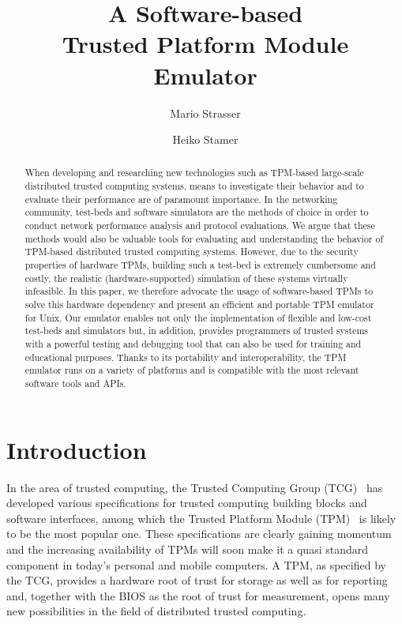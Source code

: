 \documentclass[runningheads]{llncs}
\title{\bf A Software-based\\ Trusted Platform Module Emulator}
\author{Mario Strasser\inst{1} \and Heiko Stamer\inst{2}}
\institute{
	ETH Zurich, Switzerland\\
	\email{strasser@tik.ee.ethz.ch}\\[3mm]
\and
	Fachbereich Elektrotechnik/Informatik, Universit\"at Kassel\\
	34109 Kassel, Germany\\
	\email{stamer@theory.informatik.uni-kassel.de}\\
}
\date{}
\begin{document}
\maketitle

\begin{abstract}
	When developing and researching new technologies such as TPM-based
	large-scale distributed trusted computing systems, means to investigate
	their behavior and to evaluate their performance are of paramount
	importance. In the networking community, test-beds and software simulators
	are the methods of choice in order to conduct network performance analysis
	and protocol evaluations. We argue that these methods would also be valuable
	tools for evaluating and understanding the behavior of TPM-based distributed
	trusted computing systems. However, due to the security properties of
	hardware TPMs, building such a test-bed is extremely cumbersome and costly,
	the realistic (hardware-supported) simulation of these systems virtually
	infeasible. In this paper, we therefore advocate the usage of software-based
	TPMs to solve this hardware dependency and present an efficient and portable
	TPM emulator for Unix. Our emulator enables not only the implementation of
	flexible and low-cost test-beds and simulators but, in addition, provides
	programmers of trusted systems with a powerful testing and debugging tool
	that can also be used for training and educational purposes. Thanks to its
	portability and interoperability, the TPM emulator runs on a variety of
	platforms and is compatible with the most relevant software tools and APIs.
\end{abstract}


\section{Introduction}
In the area of trusted computing, the Trusted Computing Group (TCG)~\cite{TCG}
has developed various specifications for trusted computing building blocks and
software interfaces, among which the Trusted Platform Module
(TPM)~\cite{TCGSpec} is likely to be the most popular one. These specifications
are clearly gaining momentum and the increasing availability of TPMs will soon
make it a quasi standard component in today's personal and mobile computers.
A TPM, as specified by the TCG, provides a hardware root of trust for storage
as well as for reporting and, together with the BIOS as the root of trust for
measurement, opens many new possibilities in the field of distributed trusted
computing.
\end{document}
